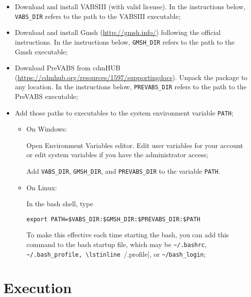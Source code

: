 \documentclass{book}
\begin{document}
\begin{itemize}
  \item Download and install VABSIII (with valid license). In the 
    instructions below, \lstinline|VABS_DIR| refers to the path to the VABSIII 
    executable;
  \item Download and install Gmsh (\url{http://gmsh.info/}) following the 
    official instructions. In the instructions below, \lstinline|GMSH_DIR| refers 
    to the path to the Gmsh executable;
  \item Download PreVABS from cdmHUB 
    (\url{https://cdmhub.org/resources/1597/supportingdocs}). 
    Unpack the package to any location. In the instructions below, 
    \lstinline|PREVABS_DIR| refers to the path to the PreVABS executable;
  \item Add those paths to executables to the system environment variable 
    \lstinline|PATH|;
  \begin{itemize}
    \item On Windows:

      Open Environment Variables editor. Edit user variables for your 
      account or edit system variables if you have the administrator access;

      Add \lstinline|VABS_DIR|, \lstinline|GMSH_DIR|, and \lstinline|PREVABS_DIR| 
      to the variable \lstinline|PATH|.

    \item On Linux:

      In the bash shell, type
    
      \lstinline|export PATH=$VABS_DIR:$GMSH_DIR:$PREVABS_DIR:$PATH|

      To make this effective each time starting the bash, you can add 
      this command to the bash startup file, which may be \lstinline|~/.bashrc|, 
      \lstinline|~/.bash_profile, \lstinline|~/.profile|, or \lstinline|~/bash_login|;
  \end{itemize}
\end{itemize}


\section{Execution}
\label{sec:start}
\end{document}
